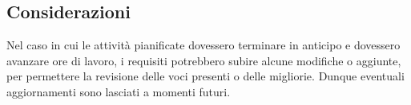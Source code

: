 
	\subsection{Considerazioni}
Nel caso in cui le attività pianificate dovessero terminare in anticipo e dovessero avanzare ore di lavoro, i requisiti potrebbero subire alcune modifiche o aggiunte, per permettere la revisione delle voci presenti o delle migliorie. Dunque eventuali aggiornamenti sono lasciati a momenti
futuri.


